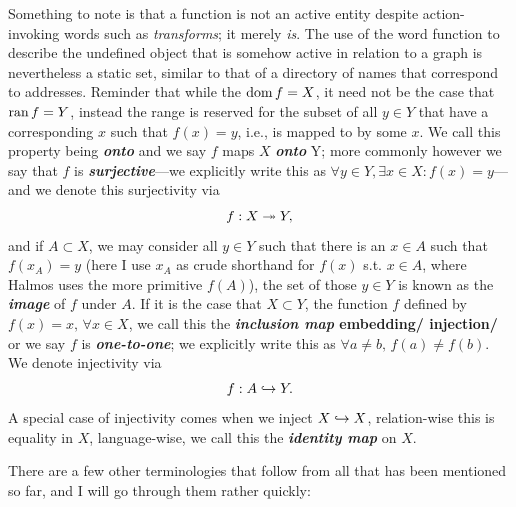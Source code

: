 \documentclass{report}
\begin{document}
Something to note is that a function is not an active entity despite action-invoking words such as \emph{transforms}; it merely \emph{is}. The use of the word function to describe the undefined object that is somehow active in relation to a graph is nevertheless a static set, similar to that of a directory of names that correspond to addresses.
Reminder that while the \(\operatorname{dom} f = X\), it need not be the case that \(\operatorname{ran} f =Y\), instead the range is reserved for the subset of all \(y \in Y\) that have a corresponding \(x\) such that \(f(x)=y\), i.e., is mapped to by some \(x\). We call this property being \textbf{\emph{onto}} and we say \(f\) maps \(X\) \textbf{\emph{onto}} Y; more commonly however we say that \(f\) is \textbf{\emph{surjective}}---we explicitly write this as \(\forall y \in  Y, \exists  x \in  X : f(x)=y\)---and we denote this surjectivity via
\[ f : X \twoheadrightarrow Y,\]
and if \(A\subset X\), we may consider all \(y\in  Y\) such that there is an \(x\in A\) such that \(f(x_A)=y\) (here I use \(x_A\) as crude shorthand for \(f(x)\) s.t. \(x \in A\), where Halmos uses the more primitive \(f(A)\)), the set of those \(y \in Y\) is known as the \textbf{\emph{image}} of \(f\) under \(A\). If it is the case that \(X \subset  Y\), the function \(f\) defined by \(f(x)=x , \, \forall x \in X\), we call this the \textbf{\emph{inclusion map} embedding/ injection/} or we say \(f\) is \textbf{\emph{one-to-one}}; we explicitly write this as \(\forall a\neq b, \, f(a)\neq f(b)\). We denote injectivity via
\[ f : A \hookrightarrow Y.\]
A special case of injectivity comes when we inject \(X \hookrightarrow X\), relation-wise this is equality in \(X\), language-wise, we call this the \textbf{\emph{identity map}} on \(X\).


There are a few other terminologies that follow from all that has been mentioned so far, and I will go through them rather quickly:

\end{document}

